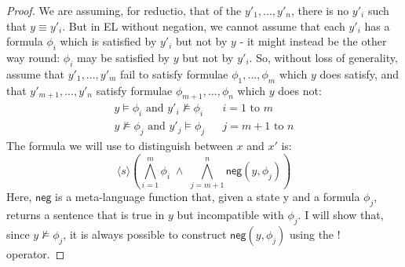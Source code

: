\begin{proof}
We are assuming, for reductio, that of the $y'_1, ..., y'_n$, there is no $y'_i$ such that $y \equiv y'_i$.
But in EL without negation, we cannot assume that each $y'_i$ has a formula $\phi_i$ which is satisfied by $y'_i$ but not by $y$ - it might instead be the other way round: $\phi_i$ may be satisfied by $y$ but not by $y'_i$. So, without loss of generality, assume that $y'_1, ..., y'_m$ fail to satisfy formulae $\phi_1, ..., \phi_m$ which $y$ does satisfy, and that $y'_{m+1}, ..., y'_n$ satisfy formulae $\phi_{m+1}, ..., \phi_n$ which $y$ does not:
\begin{eqnarray}
y \models \phi_i \mbox{ and } y'_i \nvDash \phi_i & & i = 1 \mbox{ to } m \nonumber \\
y \nvDash \phi_j \mbox{ and } y'_j \models \phi_j & & j = m+1 \mbox{ to } n \nonumber
\end{eqnarray}
The formula we will use to distinguish between $x$ and $x'$ is:
\[
 \langle s \rangle ( \bigwedge_{i=1}^m \phi_i \; \land \; \bigwedge_{j=m+1}^n \mathsf{neg}(y, \phi_j))
 \]
 Here, $\mathsf{neg}$ is a meta-language function that, given a state y and a formula $\phi_j$, returns a sentence that is true in $y$ but incompatible with $\phi_j$. I will show that, since $y \nvDash \phi_j$, it is always possible to construct $ \mathsf{neg}(y, \phi_j)$ using the $!$ operator.


\end{proof}
